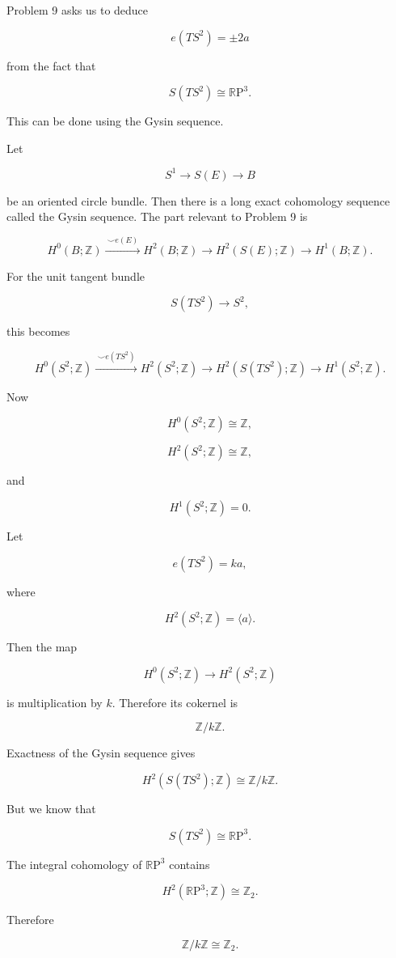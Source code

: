\documentclass[12pt,a4paper]{article}
\newcommand{\RP}{\mathbb{R}\mathrm{P}}
\newcommand{\Z}{\mathbb{Z}}
\theoremstyle{notespace}
\begin{document}
	Problem 9 asks us to deduce
	
	\[
	e(TS^{2})=\pm 2a
	\]
	
	from the fact that
	
	\[
	S(TS^{2})\cong \RP^{3}.
	\]
	
	This can be done using the Gysin sequence.
	
	Let
	
	\[
	S^{1}\to S(E)\to B
	\]
	
	be an oriented circle bundle. Then there is a long exact cohomology sequence called the Gysin sequence. The part relevant to Problem 9 is
	
	\[
	H^{0}(B;\Z)
	\xrightarrow{\ \smile e(E)\ }
	H^{2}(B;\Z)
	\to
	H^{2}(S(E);\Z)
	\to
	H^{1}(B;\Z).
	\]
	
	For the unit tangent bundle
	
	\[
	S(TS^{2})\to S^{2},
	\]
	
	this becomes
	
	\[
	H^{0}(S^{2};\Z)
	\xrightarrow{\ \smile e(TS^{2})\ }
	H^{2}(S^{2};\Z)
	\to
	H^{2}(S(TS^{2});\Z)
	\to
	H^{1}(S^{2};\Z).
	\]
	
	Now
	
	\[
	H^{0}(S^{2};\Z)\cong \Z,
	\]
	
	\[
	H^{2}(S^{2};\Z)\cong \Z,
	\]
	
	and
	
	\[
	H^{1}(S^{2};\Z)=0.
	\]
	
	Let
	
	\[
	e(TS^{2})=ka,
	\]
	
	where
	
	\[
	H^{2}(S^{2};\Z)=\langle a\rangle.
	\]
	
	Then the map
	
	\[
	H^{0}(S^{2};\Z)\to H^{2}(S^{2};\Z)
	\]
	
	is multiplication by \(k\). Therefore its cokernel is
	
	\[
	\Z/k\Z.
	\]
	
	Exactness of the Gysin sequence gives
	
	\[
	H^{2}(S(TS^{2});\Z)\cong \Z/k\Z.
	\]
	
	But we know that
	
	\[
	S(TS^{2})\cong \RP^{3}.
	\]
	
	The integral cohomology of \(\RP^{3}\) contains
	
	\[
	H^{2}(\RP^{3};\Z)\cong \Z_{2}.
	\]
	
	Therefore
	
	\[
	\Z/k\Z\cong \Z_{2}.
	\]
	
\end{document}
